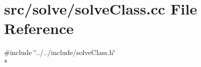 \section{src/solve/solve\-Class.cc File Reference}
\label{solve_class_8cc}
{\ttfamily \#include \char`\"{}../../include/solve\-Class.\-h\char`\"{}}\\*
